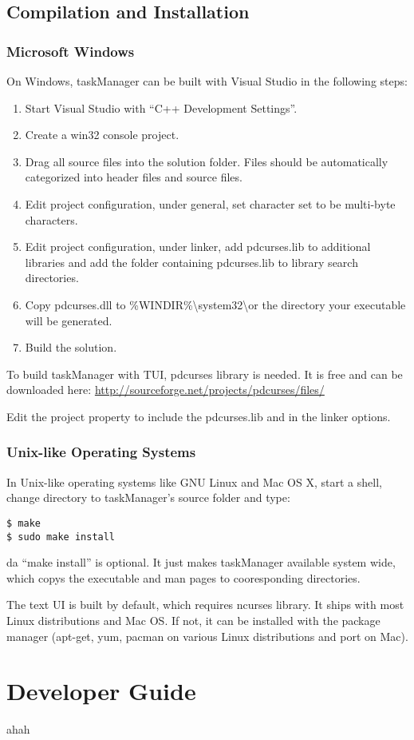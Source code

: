 \documentclass[12pt, a4paper]{article}
\begin{document}
\subsection{Compilation and Installation}
\subsubsection{Microsoft Windows}

On Windows, taskManager can be built with Visual Studio in the following steps:
\begin{enumerate}
\item Start Visual Studio with ``C++ Development Settings''.
\item Create a win32 console project.
\item Drag all source files into the solution folder. Files should be automatically categorized into header files and source files.
\item Edit project configuration, under general, set character set to be multi-byte characters.
\item Edit project configuration, under linker, add pdcurses.lib to additional libraries and add the folder containing pdcurses.lib to library search directories.
\item Copy pdcurses.dll to \%WINDIR\%\textbackslash system32\textbackslash or the directory your executable will be generated.
\item Build the solution.
\end{enumerate}

To build taskManager with TUI, pdcurses library is needed.
It is free and can be downloaded here:
\url{http://sourceforge.net/projects/pdcurses/files/}

Edit the project property to include the pdcurses.lib and in the linker options.

\subsubsection{Unix-like Operating Systems}

In Unix-like operating systems like GNU Linux and Mac OS X, start a shell, change directory to taskManager's source folder and type:

\texttt{\$ make\\
  \$ sudo make install}

da ``make install'' is optional. It just makes taskManager available system wide, which copys the executable and man pages to cooresponding directories.

The text UI is built by default, which requires ncurses library.
It ships with most Linux distributions and Mac OS. If not, it can be installed with the package manager (apt-get, yum, pacman on various Linux distributions and port on Mac).

\section{Developer Guide}
ahah
\end{document}
